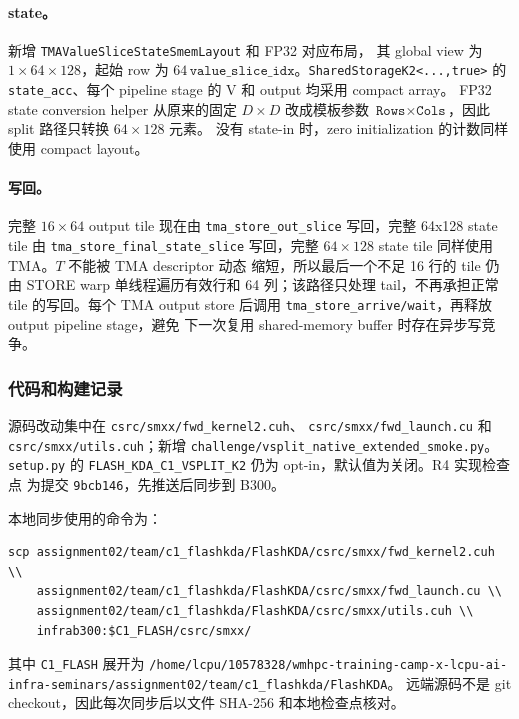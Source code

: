 \documentclass[11pt,a4paper,fontset=none]{ctexart}
\newcommand{\code}[1]{\texttt{#1}}
\begin{document}
\paragraph{state。}新增 \code{TMAValueSliceStateSmemLayout} 和 FP32 对应布局，
其 global view 为 \(1\times64\times128\)，起始 row 为
\(64\,\code{value\_slice\_idx}\)。\code{SharedStorageK2<...,true>} 的
\code{state\_acc}、每个 pipeline stage 的 V 和 output 均采用 compact array。
FP32 state conversion helper 从原来的固定 \(D\times D\) 改成模板参数
\(\code{Rows}\times\code{Cols}\)，因此 split 路径只转换 \(64\times128\) 元素。
没有 state-in 时，zero initialization 的计数同样使用 compact layout。

\paragraph{写回。}完整 \(16\times64\) output tile 现在由
\code{tma\_store\_out\_slice} 写回，完整 64x128 state tile 由
\code{tma\_store\_final\_state\_slice} 写回，完整 \(64\times128\) state tile 同样使用 TMA。\(T\) 不能被 TMA descriptor 动态
缩短，所以最后一个不足 16 行的 tile 仍由 STORE warp 单线程遍历有效行和 64
列；该路径只处理 tail，不再承担正常 tile 的写回。每个 TMA output store
后调用 \code{tma\_store\_arrive/wait}，再释放 output pipeline stage，避免
下一次复用 shared-memory buffer 时存在异步写竞争。

\subsubsection{代码和构建记录}

源码改动集中在 \code{csrc/smxx/fwd\_kernel2.cuh}、
\code{csrc/smxx/fwd\_launch.cu} 和 \code{csrc/smxx/utils.cuh}；新增
\code{challenge/vsplit\_native\_extended\_smoke.py}。\code{setup.py} 的
\code{FLASH\_KDA\_C1\_VSPLIT\_K2} 仍为 opt-in，默认值为关闭。R4 实现检查点
为提交 \code{9bcb146}，先推送后同步到 B300。

本地同步使用的命令为：

\begin{lstlisting}
scp assignment02/team/c1_flashkda/FlashKDA/csrc/smxx/fwd_kernel2.cuh \\
    assignment02/team/c1_flashkda/FlashKDA/csrc/smxx/fwd_launch.cu \\
    assignment02/team/c1_flashkda/FlashKDA/csrc/smxx/utils.cuh \\
    infrab300:$C1_FLASH/csrc/smxx/
\end{lstlisting}

其中 \code{C1\_FLASH} 展开为
\code{/home/lcpu/10578328/wmhpc-training-camp-x-lcpu-ai-infra-seminars/assignment02/team/c1\_flashkda/FlashKDA}。
远端源码不是 git checkout，因此每次同步后以文件 SHA-256 和本地检查点核对。
\end{document}
